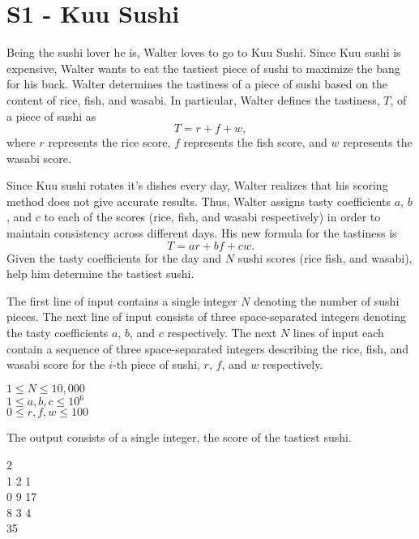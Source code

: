 \section*{S1 - Kuu Sushi}
Being the sushi lover he is, Walter loves to go to Kuu Sushi. Since Kuu sushi is expensive, Walter wants to eat the tastiest piece of sushi to maximize the bang for his buck. Walter determines the tastiness of a piece of sushi based on the content of rice, fish, and wasabi. In particular, Walter defines the tastiness, $T$, of a piece of sushi as $$T=r+f+w,$$ where $r$ represents the rice score, $f$ represents the fish score, and $w$ represents the wasabi score.

Since Kuu sushi rotates it's dishes every day, Walter realizes that his scoring method does not give accurate results. Thus, Walter assigns tasty coefficients $a$, $b$, and $c$ to each of the scores (rice, fish, and wasabi respectively) in order to maintain consistency across different days. His new formula for the tastiness is $$T=ar+bf+cw.$$ Given the tasty coefficients for the day and $N$ sushi scores (rice fish, and wasabi), help him determine the tastiest sushi.

The first line of input contains a single integer $N$ denoting the number of sushi pieces. The next line of input consists of three space-separated integers denoting the tasty coefficients $a$, $b$, and $c$ respectively. The next $N$ lines of input each contain a sequence of three space-separated integers describing the rice, fish, and wasabi score for the $i$-th piece of sushi, $r$, $f$, and $w$ respectively.

\constraints
$1 \leq N \leq 10,000$ \\
$1 \leq a, b, c \leq 10^6$ \\
$0 \leq r, f, w \leq 100$

\outputformat
The output consists of a single integer, the score of the tastiest sushi.

\addsample
{
    2 \\
    1 2 1 \\ 
    0 9 17 \\
    8 3 4 \\
}
{
    35
}